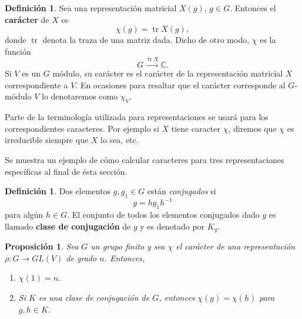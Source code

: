 \documentclass[12pt]{book}
\newtheorem{proposition}[theorem]{Proposición}
\theoremstyle{definition}
\newtheorem{definition}[theorem]{Definición}
\DeclareMathOperator{\tr}{tr}
\newcounter{in}
\newcounter{ini}
\begin{document}
\begin{definition}
  Sea una representación matricial $X(g)$, $g\in G$. Entonces el \textbf{carácter} de $X$ es
  \begin{equation*}
    \chi(g)=\tr X(g),
  \end{equation*}
  donde $\tr$ denota la traza de una matriz dada. Dicho de otro modo,
  $\chi$ es la función
\begin{equation*}
  G\stackrel{\tr X}{\rightarrow}\mathbb{C}.
\end{equation*}
Si $V$ es un $G$ módulo, su carácter es el carácter de la
representación matricial $X$ correspondiente a $V$. En ocasiones para resaltar
que el carácter corresponde al $G$-módulo $V$ lo denotaremos como $\chi_{V}$.
\end{definition}

Parte de la terminología utilizada para representaciones se
usará para los correspondientes caracteres. Por ejemplo si $X$ tiene
caracter $\chi$, diremos que $\chi$ es irreducible siempre que $X$ lo
sea, etc.

Se muestra un ejemplo de cómo calcular caracteres para tres
representaciones específicas al final de ésta sección.
\begin{definition}
  Dos elementos $g,g_{1}\in G$ están \emph{conjugados} si
  \begin{equation*}
  g=hg_{1}h^{-1}
\end{equation*}
para algún $h\in G$. El conjunto de todos los elementos conjugados
dado $g$ es llamado \textbf{clase de conjugación} de $g$ y es
denotado por $K_{g}$.
\end{definition}

\begin{proposition}
  Sea $G$ un grupo finito y sea $\chi$ el carácter de una
  representación $\rho:G\rightarrow GL(V)$ de grado $n$. Entonces,
  \begin{enumerate}
  \item $\chi(1)=n$.
  \item Si $K$ es una clase de conjugación de $G$, entonces $\chi(g)=\chi(h)$ para $g,h\in K$. 
  \end{enumerate}
\end{proposition}
\end{document}
